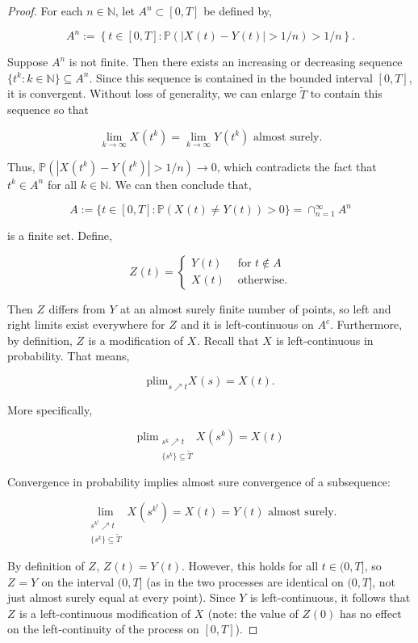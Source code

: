\documentclass[12pt]{article}
\newcommand{\mb}{\mathbb}
\newcommand{\ra}{\rightarrow}
\newcommand{\te}{\text}
\newcommand{\ind}{\hspace{24pt}}
\newcommand{\pr}{\mb{P}}							%
\newcommand{\T}{T}								%
\renewcommand{\t}{t}							%
\newcommand{\pup}[1]{^{#1}}							%
\renewcommand{\tt}{s}								%
\renewcommand{\it}{k}								%
\newcommand{\itt}{i}								%
\newcommand{\numb}{n}								%
\newcommand{\rxvt}[2]{X_{#1}{(#2)}}					%
\newcommand{\rxvtt}[2]{Y_{#1}{(#2)}}				%
\newcommand{\rxvttt}[2]{Z_{#1}{(#2)}}				%
\newcommand{\rxvts}[2]{X_{#1}{#2}}					%
\newcommand{\rxvtts}[2]{Y_{#1}{#2}}					%
\newcommand{\rxvttts}[2]{Z_{#1}{#2}}				%
\newcommand{\alt}{\widetilde}						%
\newcommand{\typset}{A}							%
\begin{document}
\begin{proof}
\ind For each \(\numb \in \mb{N}\), let \(\typset\pup{\numb} \subset [0,\T]\) be defined by,

\[\typset\pup{\numb} := \left\{\t\in [0,\T]: \pr\left(|\rxvt{}{\t} - \rxvtt{}{\t}| > 1/\numb\right) > 1/\numb\right\}.\] 

Suppose \(\typset\pup{\numb}\) is not finite. Then there exists an increasing or decreasing sequence \(\{\t\pup{\it}:\it\in \mb{N}\}\subseteq \typset\pup{\numb}\). Since this sequence is contained in the bounded interval \([0,\T]\), it is convergent. Without loss of generality, we can enlarge \(\alt{T}\) to contain this sequence so that

\[\lim_{\it \ra\infty} \rxvt{}{\t\pup{\it}} = \lim_{\it\ra\infty} \rxvtt{}{\t\pup{\it}} \te{ almost surely.}\]

Thus, \(\pr(|\rxvt{}{\t\pup{\it}} - \rxvtt{}{\t\pup{\it}}| > 1/\numb) \ra 0\), which contradicts the fact that \(\t\pup{\it} \in \typset\pup{\numb}\) for all \(\it\in\mb{N}\). We can then conclude that,

\[\typset:= \{\t\in [0,\T]: \pr(\rxvt{}{\t} \neq \rxvtt{}{\t}) > 0\} = \cap_{\numb = 1}^\infty \typset\pup{\numb}\]

is a finite set. Define,

\[\rxvttt{}{\t}= \begin{cases}
\rxvtt{}{\t} &\te{ for } \t \notin \typset\\
\rxvt{}{\t} &\te{ otherwise.}
\end{cases}\]

Then \(\rxvttts{}{}\) differs from \(\rxvtts{}{}\) at an almost surely finite number of points, so left and right limits exist everywhere for \(\rxvttts{}{}\) and it is left-continuous on \(\typset^c\). Furthermore, by definition, \(\rxvttts{}{}\) is a modification of \(\rxvts{}{}\). Recall that \(\rxvts{}{}\) is left-continuous in probability. That means,

\[\te{plim}_{\tt\nearrow \t} \rxvt{}{\tt} = \rxvt{}{\t}.\]

More specifically,

\[\te{plim}_{\substack{\tt\pup{\it}\nearrow \t\\\{\tt\pup{\it}\} \subseteq \alt{T}}} \rxvt{}{\tt\pup{\it}} = \rxvt{}{\t}\]

Convergence in probability implies almost sure convergence of a subsequence:

\[\lim_{\substack{\tt\pup{\it\pup{\itt}} \nearrow \t\\\{\tt\pup{\it}\}\subseteq \alt{T}}} \rxvt{}{\tt\pup{\it\pup{\itt}}} = \rxvt{}{\t} = \rxvtt{}{\t} \te{ almost surely.}\]

By definition of \(\rxvttts{}{}\), \(\rxvttt{}{\t} = \rxvtt{}{\t}\). However, this holds for all \(\t \in (0,\T]\), so \(\rxvttts{}{} = \rxvtts{}{}\) on the interval \((0,\T]\) (as in the two processes are identical on \((0,\T]\), not just almost surely equal at every point). Since \(\rxvtts{}{}\) is left-continuous, it follows that \(\rxvttts{}{}\) is a left-continuous modification of \(\rxvts{}{}\) (note: the value of \(\rxvttt{}{0}\) has no effect on the left-continuity of the process on \([0,\T]\)).
\end{proof}
\end{document}
